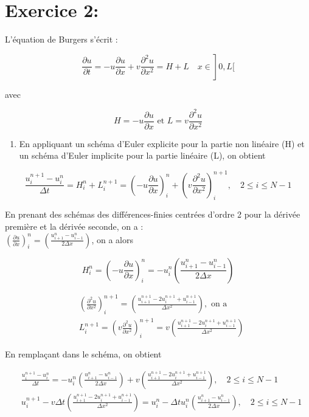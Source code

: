 \documentclass[10pt]{article}
\begin{document}
\section*{Exercice 2:}
L'équation de Burgers s'écrit :

\[
\left.\frac{\partial u}{\partial t}=-u \frac{\partial u}{\partial x}+v \frac{\partial^{2} u}{\partial x^{2}}=H+L \quad x \in\right] 0, L[
\]

avec

\[
H=-u \frac{\partial u}{\partial x} \text { et } L=v \frac{\partial^{2} u}{\partial x^{2}}
\]

\begin{enumerate}
  \item En appliquant un schéma d'Euler explicite pour la partie non linéaire (H) et un schéma d'Euler implicite pour la partie linéaire (L), on obtient
\end{enumerate}

\[
\frac{u_{i}^{n+1}-u_{i}^{n}}{\Delta t}=H_{i}^{n}+L_{i}^{n+1}=\left(-u \frac{\partial u}{\partial x}\right)_{i}^{n}+\left(v \frac{\partial^{2} u}{\partial x^{2}}\right)_{i}^{n+1}, \quad 2 \leq i \leq N-1
\]

En prenant des schémas des différences-finies centrées d'ordre 2 pour la dérivée première et la dérivée seconde, on a :\\
\(\left(\frac{\partial u}{\partial x}\right)_{i}^{n}=\left(\frac{u_{i+1}^{n}-u_{i-1}^{n}}{2 \Delta x}\right)\), on a alors

\[
H_{i}^{n}=\left(-u \frac{\partial u}{\partial x}\right)_{i}^{n}=-u_{i}^{n}\left(\frac{u_{i+1}^{n}-u_{i-1}^{n}}{2 \Delta x}\right)
\]

\[
\begin{aligned}
& \left(\frac{\partial^{2} u}{\partial x^{2}}\right)_{i}^{n+1}=\left(\frac{u_{i+1}^{n+1}-2 u_{i}^{n+1}+u_{i-1}^{n+1}}{\Delta x^{2}}\right), \text { on a } \\
& L_{i}^{n+1}=\left(v \frac{\partial^{2} u}{\partial x^{2}}\right)_{i}^{n+1}=v\left(\frac{u_{i+1}^{n+1}-2 u_{i}^{n+1}+u_{i-1}^{n+1}}{\Delta x^{2}}\right)
\end{aligned}
\]

En remplaçant dans le schéma, on obtient

\[
\begin{aligned}
& \frac{u_{i}^{n+1}-u_{i}^{n}}{\Delta t}=-u_{i}^{n}\left(\frac{u_{i+1}^{n}-u_{i-1}^{n}}{2 \Delta x}\right)+v\left(\frac{u_{i+1}^{n+1}-2 u_{i}^{n+1}+u_{i-1}^{n+1}}{\Delta x^{2}}\right), \quad 2 \leq i \leq N-1 \\
& u_{i}^{n+1}-v \Delta t\left(\frac{u_{i+1}^{n+1}-2 u_{i}^{n+1}+u_{i-1}^{n+1}}{\Delta x^{2}}\right)=u_{i}^{n}-\Delta t u_{i}^{n}\left(\frac{u_{i+1}^{n}-u_{i-1}^{n}}{2 \Delta x}\right), \quad 2 \leq i \leq N-1
\end{aligned}
\]
\end{document}

